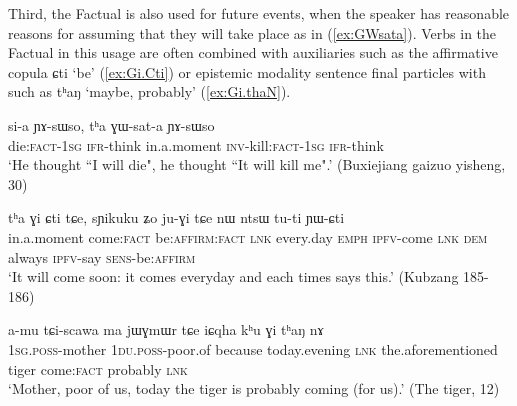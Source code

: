 \documentclass[oldfontcommands,oneside,a4paper,11pt]{article}
\newcommand{\ipa}[1]{{\phon \mbox{#1}}} %
\newcommand{\refb}[1]{(\ref{#1})}
\newcommand{\factual}[1]{\textsc{:fact}}
\begin{document}
Third, the Factual is also used for future events, when the speaker has reasonable reasons for assuming that they will take place as in \refb{ex:GWsata}. Verbs in the Factual in this usage are often combined with auxiliaries such as the affirmative copula \ipa{ɕti} `be' (\ref{ex:Gi.Cti}) or epistemic modality sentence final particles with  such as \ipa{tʰaŋ} `maybe, probably' (\ref{ex:Gi.thaN}).

\begin{exe}
\ex \label{ex:GWsata}
\gll
\ipa{si-a}   \ipa{ɲɤ-sɯso,} \ipa{tʰa}  	\ipa{ɣɯ-sat-a}  \ipa{ɲɤ-sɯso} \\
die:\textsc{fact-1sg} \textsc{ifr}-think in.a.moment \textsc{inv}-kill:\textsc{fact-1sg} \textsc{ifr}-think \\
\glt `He thought ``I will die", he thought ``It will kill me".' (Buxiejiang gaizuo yisheng, 30)
\end{exe}

\begin{exe}
\ex \label{ex:Gi.Cti}
\gll
 	\ipa{tʰa} 	\ipa{ɣi} 	\ipa{ɕti} 	\ipa{tɕe,} 	\ipa{sɲikuku} 	\ipa{ʑo} 	\ipa{ju-ɣi} 	\ipa{tɕe} 	\ipa{nɯ} 	\ipa{ntsɯ} 	\ipa{tu-ti} 	\ipa{ɲɯ-ɕti} 	\\
 in.a.moment come\factual{} be:\textsc{affirm}\factual{} \textsc{lnk} every.day \textsc{emph} \textsc{ipfv}-come \textsc{lnk} \textsc{dem} always \textsc{ipfv}-say \textsc{sens}-be:\textsc{affirm} \\
\glt `It will come  soon: it comes everyday and each times says this.' (Kubzang 185-186)
\end{exe}

\begin{exe}
\ex \label{ex:Gi.thaN}
\gll
 \ipa{a-mu} 	\ipa{tɕi-scawa} 	\ipa{ma} 	\ipa{jɯɣmɯr} 	\ipa{tɕe} 	\ipa{iɕqha} 	\ipa{kʰu} 	\ipa{ɣi} 	\ipa{tʰaŋ} 	\ipa{nɤ} 	\\
 \textsc{1sg.poss}-mother  \textsc{1du.poss}-poor.of because today.evening \textsc{lnk} the.aforementioned tiger  come\factual{} probably \textsc{lnk} \\
\glt `Mother, poor of us, today the tiger is probably coming (for us).' (The tiger, 12)
 \end{exe}

 

 
\end{document}
